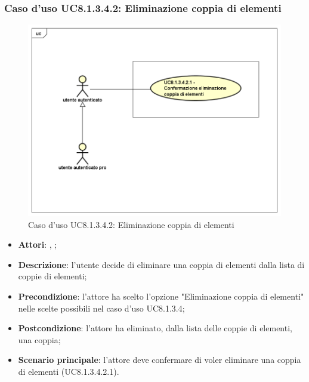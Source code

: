 	\subsubsection{Caso d'uso UC8.1.3.4.2: Eliminazione coppia di elementi}
	\label{UC8.1.3.4.2}
	\begin{figure}[h]
		\centering
		\includegraphics[scale=0.5,keepaspectratio]{UML/UC8_1_3_4_2.png}
		\caption{Caso d'uso UC8.1.3.4.2: Eliminazione coppia di elementi}
	\end{figure}
	\FloatBarrier
	\begin{itemize}
		\item \textbf{Attori}: \uau, \uaupro;
		\item \textbf{Descrizione}: l'utente decide di eliminare una coppia di elementi dalla lista di coppie di elementi;
		\item \textbf{Precondizione}: l'attore ha scelto l'opzione "Eliminazione coppia di elementi" nelle scelte possibili nel caso d'uso UC8.1.3.4;
		\item \textbf{Postcondizione}: l'attore ha eliminato, dalla lista delle coppie di elementi, una coppia;
		\item \textbf{Scenario principale}: l'attore deve confermare di voler eliminare una coppia di elementi (UC8.1.3.4.2.1).
	\end{itemize}

